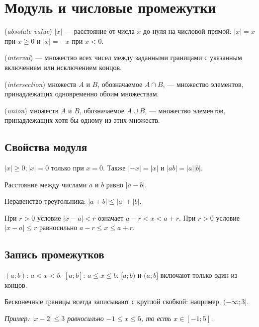 \chapter{Модуль и числовые промежутки}\label{chap:c08}
\begin{definition} (\emph{absolute value}) \(| x |\) — расстояние от числа \(x\) до нуля на числовой прямой: \(| x | = x\) при \(x \ge  0\) и \(| x | = - x\) при \(x < 0\).\end{definition}
\begin{definition} (\emph{interval}) — множество всех чисел между заданными границами с указанным включением или исключением концов.\end{definition}
\begin{definition} (\emph{intersection}) множеств \(A\) и \(B\), обозначаемое \(A\cap B\), — множество элементов, принадлежащих одновременно обоим множествам.\end{definition}
\begin{definition} (\emph{union}) множеств \(A\) и \(B\), обозначаемое \(A\cup B\), — множество элементов, принадлежащих хотя бы одному из этих множеств.\end{definition}
\section{Свойства модуля}
\(| x | \ge  0;\allowbreak | x | = 0\) только при \(x = 0\). Также \(| - x | = | x |\) и \(| ab | = | a | | b |\).\par
Расстояние между числами \(a\) и \(b\) равно \(| a - b |\).\par
Неравенство треугольника: \(| a + b | \le  | a | + | b |\).\par
При \(r > 0\) условие \(| x - a | < r\) означает \(a - r < x < a + r\). При \(r>0\) условие \(|x-a|\le r\) равносильно \(a-r\le x\le a+r\).\par
\section{Запись промежутков}
\((a;\allowbreak b)\): \(a < x < b\). \([a;\allowbreak b]\): \(a \le x \le b\). \([a;\allowbreak b)\) и \((a;\allowbreak b]\) включают только один из концов.\par
Бесконечные границы всегда записывают с круглой скобкой: например, \((- \infty ;\allowbreak 3]\).\par
{\small\textit{Пример: \(| x - 2 | \le  3\) равносильно \(- 1 \le  x \le  5\), то есть \(x \in  [- 1;\allowbreak 5]\).}}\par


